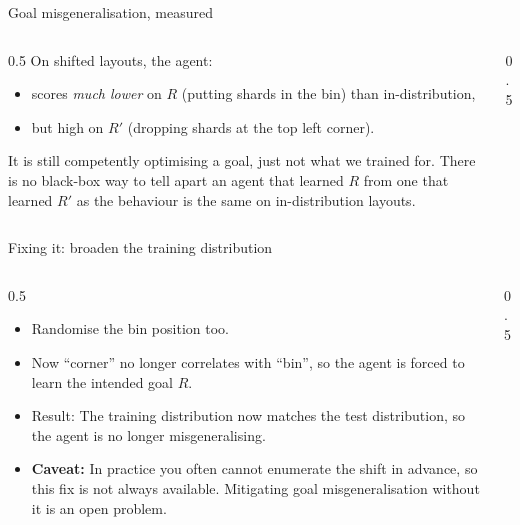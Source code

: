 \begin{frame}{Goal misgeneralisation, measured}
\begin{columns}
\begin{column}{0.5\textwidth}
On shifted layouts, the agent:
\begin{itemize}
  \item scores \emph{much lower} on $R$ (putting shards in the bin) than in-distribution,
  \item but high on $R'$ (dropping shards at the top left corner).
\end{itemize}
\pause
It is still competently optimising a goal, just not what we trained for. 
There is no black-box way to tell apart an agent that learned $R$ from one that learned $R'$
as the behaviour is the same on in-distribution layouts.
\end{column}
\begin{column}{0.5\textwidth}
\centering
{}
\end{column}
\end{columns}
\end{frame}

\begin{frame}[t]{Fixing it: broaden the training distribution}
\begin{columns}[T]
\begin{column}{0.5\textwidth}  
\begin{itemize}
\item Randomise the bin position too.
\item Now ``corner'' no longer correlates with ``bin'',
so the agent is forced to learn the intended goal $R$.
\pause
\item Result: The training distribution now matches the test distribution,
so the agent is no longer misgeneralising.
\pause
\item \textbf{Caveat:} In practice you often cannot enumerate the shift in advance,
so this fix is not always available. Mitigating goal misgeneralisation without it is an open problem.
\end{itemize}
\end{column}
\begin{column}{0.5\textwidth}
\centering
{}
\end{column}
\end{columns}
\end{frame}

